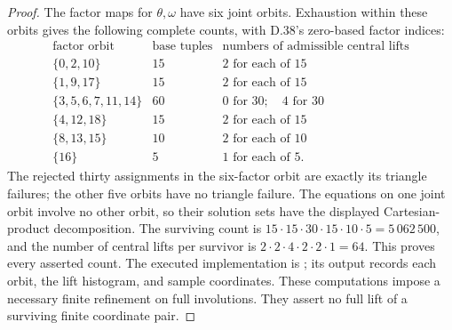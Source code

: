 \begin{proof}
The factor maps for $\theta,\omega$ have six joint
orbits.  Exhaustion within these orbits gives the
following complete counts, with D.38's zero-based
factor indices:
\[
\begin{array}{c|r|l}
 \text{factor orbit}&\text{base tuples}&
       \text{numbers of admissible central lifts}\\ \hline
 \{0,2,10\}&15&2\text{ for each of }15\\
 \{1,9,17\}&15&2\text{ for each of }15\\
 \{3,5,6,7,11,14\}&60&0\text{ for }30;\quad4\text{ for }30\\
 \{4,12,18\}&15&2\text{ for each of }15\\
 \{8,13,15\}&10&2\text{ for each of }10\\
 \{16\}&5&1\text{ for each of }5.
\end{array}                                               \tag{D.45g}
\]
The rejected thirty assignments in the six-factor
orbit are exactly its triangle failures; the other
five orbits have no triangle failure.
The equations on one joint orbit involve no other
orbit, so their solution sets have the displayed
Cartesian-product decomposition.
The surviving count is
$15\cdot15\cdot30\cdot15\cdot10\cdot5=5\,062\,500$,
and the number of central lifts per survivor is
$2\cdot2\cdot4\cdot2\cdot2\cdot1=64$.
This proves every asserted count.
The executed implementation is
; its output
records each orbit, the lift histogram, and sample
coordinates.  These computations impose a necessary
finite refinement on full involutions.  They assert
no full lift of a surviving finite coordinate pair.
\end{proof}
